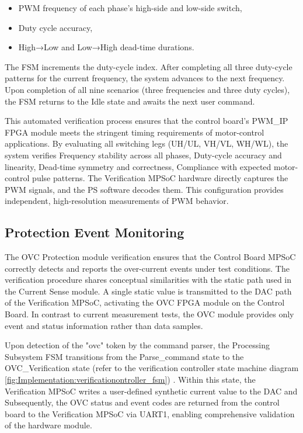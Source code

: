 \begin{itemize}
	\item \acs{PWM} frequency of each phase’s high-side and low-side switch,
	\item Duty cycle accuracy,
	\item High→Low and Low→High dead-time durations.
\end{itemize}

The \acs{FSM} increments the duty-cycle index. After completing all three duty-cycle patterns for the current frequency, the system advances to the next frequency. Upon completion of all nine scenarios (three frequencies and three duty cycles), the \acs{FSM} returns to the Idle state and awaits the next user command.

This automated verification process ensures that the control board’s \acs{PWM}\_IP \acs{FPGA} module meets the stringent timing requirements of motor-control applications. By evaluating all switching legs (UH/UL, VH/VL, WH/WL), the system verifies Frequency stability across all phases, Duty-cycle accuracy and linearity, Dead-time symmetry and correctness, Compliance with expected motor-control pulse patterns. The Verification MPSoC hardware directly captures the \acs{PWM} signals, and the \acs{PS} software decodes them. This configuration provides independent, high-resolution measurements of \acs{PWM} behavior. 

\subsection{Protection Event Monitoring}
\label{sec:Implementation:ProtectionEventMonitoring}

The \acs{OVC} Protection module verification ensures that the Control Board \acs{MPSoC} correctly detects and reports the over-current events under test conditions. The verification procedure shares conceptual similarities with the static path used in the Current Sense module. A single static value is transmitted to the \acs{DAC} path of the Verification \acs{MPSoC}, activating the \acs{OVC} \acs{FPGA} module on the Control Board. In contrast to current measurement tests, the \acs{OVC} module provides only event and status information rather than data samples.

Upon detection of the "ovc" token by the command parser, the Processing Subsystem \acs{FSM} transitions from the Parse\_command state to the \acs{OVC}\_Verification state (refer to the verification controller state machine diagram \ref{fig:Implementation:verificationontroller_fsm}) . Within this state, the Verification \acs{MPSoC} writes a user-defined synthetic current value  to the \acs{DAC} and Subsequently, the \acs{OVC} status and event codes are returned from the control board to the Verification \acs{MPSoC} via UART1, enabling comprehensive validation of the hardware module.

